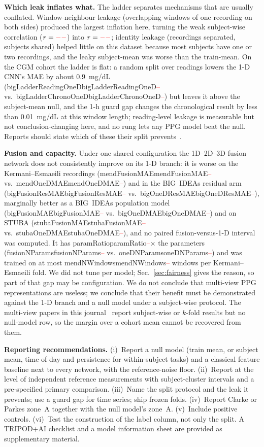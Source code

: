 \documentclass[journal]{IEEEtran}
\newcommand{\m}[1]{\ifcsname #1\endcsname\csname #1\endcsname\else\textcolor{red}{--}\fi}
\begin{document}
\textbf{Which leak inflates what.}  The ladder separates mechanisms that are
usually conflated.  Window-neighbour leakage (overlapping windows of one
recording on both sides) produced the largest inflation here, turning the
weak subject-wise correlation ($r=\m{mendOneDR}$) into
$r=\m{mendLadderWindowOneDR}$; identity leakage (recordings
separated, subjects shared) helped little on this dataset because most
subjects have one or two recordings, and the leaky subject-mean was worse
than the train-mean.  On the CGM cohort the ladder is flat: a random split
over readings lowers the 1-D CNN's MAE by about 0.9~mg/dL
(\m{bigLadderReadingOneD} vs.\ \m{bigLadderChronoOneD}) but leaves it above
the subject-mean null, and the 1-h guard gap changes the chronological
result by less than 0.01~mg/dL at this window length; reading-level leakage
is measurable but not conclusion-changing here, and no rung lets any PPG
model beat the null.  Reports should state which of these their split
prevents~\cite{saeb2017,carlson2025nerve}.

\textbf{Fusion and capacity.}  Under one shared configuration the 1D--2D--3D
fusion network does not consistently improve on its 1-D branch: it is worse
on the Kermani--Esmaeili recordings (\m{mendFusionMAE} vs.\ \m{mendOneDMAE})
and in the BIG~IDEAs residual arm (\m{bigFusionResMAE} vs.\
\m{bigOneDResMAE}), marginally better as a BIG~IDEAs population model
(\m{bigFusionMAE} vs.\ \m{bigOneDMAE}) and on STUBA (\m{stubaFusionMAE} vs.\
\m{stubaOneDMAE}), and no paired fusion-versus-1-D interval was computed.  It
has \m{paramRatio}$\times$ the parameters (\m{fusionNParams} vs.\
\m{oneDNParams}) and was trained on at most \m{mendNWindows} windows per
Kermani--Esmaeili fold.  We did not
tune per model; Sec.~\ref{sec:fairness} gives the reason, so part of that
gap may be configuration.  We do not conclude that multi-view PPG
representations are useless; we conclude that their benefit must be
demonstrated against the 1-D branch and a null model under a subject-wise
protocol.  The multi-view papers in this
journal~\cite{chen2024mvcft,ali2025jbhi} report subject-wise or $k$-fold
results but no null-model row, so the margin over a cohort mean cannot be
recovered from them.

\textbf{Reporting recommendations.}  (i)~Report a null model (train mean,
or subject mean, time of day and persistence for within-subject tasks) and a
classical feature baseline next to every network, with the reference-noise
floor.  (ii)~Report at the level of independent reference measurements with
subject-cluster intervals and a pre-specified primary comparison.
(iii)~Name the split protocol and the leak it prevents; use a guard gap for
time series; ship frozen folds.  (iv)~Report Clarke or Parkes zone~A together
with the null model's zone~A.  (v)~Include positive controls.  (vi)~Test the
construction of the label column, not only the split.  A TRIPOD+AI checklist
and a model information sheet are provided as supplementary material.
\end{document}
